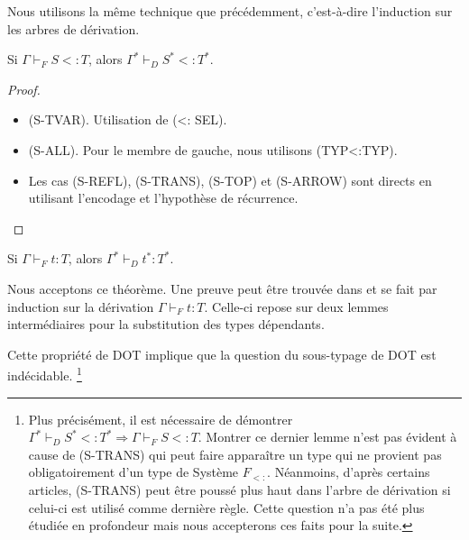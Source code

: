 Nous utilisons la même technique que précédemment, c'est-à-dire l'induction
sur les arbres de dérivation.
\begin{theorem}
  Si $\Gamma \vdash_{F} S <: T$, alors $\Gamma^{*} \vdash_{D} S^{*} <: T^{*}$.
\end{theorem}

\begin{proof}
  \begin{itemize}
  \item (S-TVAR). Utilisation de (<: SEL).
  \item (S-ALL). Pour le membre de gauche, nous utilisons (TYP<:TYP).
  \item Les cas (S-REFL), (S-TRANS), (S-TOP) et (S-ARROW) sont directs
    en utilisant l'encodage et l'hypothèse de récurrence.
  \end{itemize}
\end{proof}

\begin{theorem}
  Si $\Gamma \vdash_{F} t : T$, alors $\Gamma^{*} \vdash_{D} t^{*} : T^{*}$.
\end{theorem}

Nous acceptons ce théorème. Une preuve peut être trouvée dans
\cite{WF-DOT-2016} et se fait par induction sur la dérivation $\Gamma \vdash_{F}
t : T$. Celle-ci repose sur deux lemmes intermédiaires pour la
substitution des types dépendants.

Cette propriété de DOT implique que la question du sous-typage de DOT est
indécidable\cite{WF-DOT-2016, nada-amin-thesis}.
\footnote{Plus précisément, il est nécessaire de démontrer
$\Gamma^{*} \vdash_{D} S^{*} <: T^{*} \Rightarrow \Gamma \vdash_{F} S <: T$.
Montrer ce dernier lemme n'est pas évident à cause de (S-TRANS) qui
peut faire apparaître un type qui ne provient pas obligatoirement d'un type de
Système $F_{<:}$. Néanmoins, d'après certains articles, (S-TRANS) peut être
poussé plus haut dans l'arbre de dérivation si celui-ci est utilisé comme
dernière règle. Cette question n'a pas été plus étudiée en profondeur mais nous
accepterons ces faits pour la suite.}

